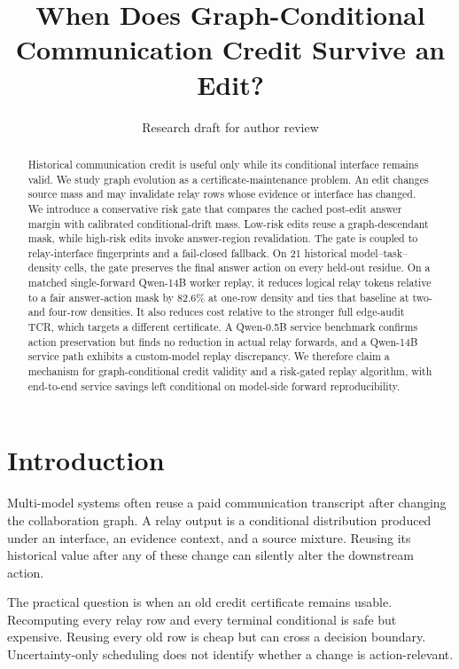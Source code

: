 \documentclass[11pt]{article}
\title{When Does Graph-Conditional Communication Credit Survive an Edit?}
\author{Research draft for author review}
\begin{document}
\maketitle

\begin{abstract}
Historical communication credit is useful only while its conditional interface remains valid. We study graph evolution as a certificate-maintenance problem. An edit changes source mass and may invalidate relay rows whose evidence or interface has changed. We introduce a conservative risk gate that compares the cached post-edit answer margin with calibrated conditional-drift mass. Low-risk edits reuse a graph-descendant mask, while high-risk edits invoke answer-region revalidation. The gate is coupled to relay-interface fingerprints and a fail-closed fallback. On 21 historical model--task--density cells, the gate preserves the final answer action on every held-out residue. On a matched single-forward Qwen-14B worker replay, it reduces logical relay tokens relative to a fair answer-action mask by 82.6\% at one-row density and ties that baseline at two- and four-row densities. It also reduces cost relative to the stronger full edge-audit TCR, which targets a different certificate. A Qwen-0.5B service benchmark confirms action preservation but finds no reduction in actual relay forwards, and a Qwen-14B service path exhibits a custom-model replay discrepancy. We therefore claim a mechanism for graph-conditional credit validity and a risk-gated replay algorithm, with end-to-end service savings left conditional on model-side forward reproducibility.
\end{abstract}

\section{Introduction}
Multi-model systems often reuse a paid communication transcript after changing the collaboration graph. A relay output is a conditional distribution produced under an interface, an evidence context, and a source mixture. Reusing its historical value after any of these change can silently alter the downstream action.

The practical question is when an old credit certificate remains usable. Recomputing every relay row and every terminal conditional is safe but expensive. Reusing every old row is cheap but can cross a decision boundary. Uncertainty-only scheduling does not identify whether a change is action-relevant.
\end{document}
